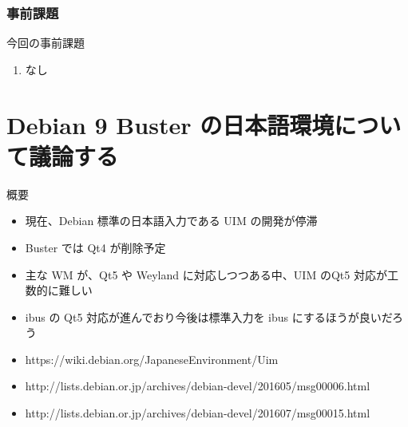 \documentclass[cjk,dvipdfmx,10pt,compress,%
hyperref={bookmarks=true,bookmarksnumbered=true,bookmarksopen=false,%
colorlinks=false,%
pdftitle={第 132 回 関西 Debian 勉強会},%
pdfauthor={かわだ},%
pdfsubject={資料},%
}]{beamer}
\begin{document}

\begin{frame}[fragile]
  \frametitle{事前課題}
  \begin{block}{今回の事前課題}
    \begin{enumerate}
    \item なし
    \end{enumerate}
  \end{block}
\end{frame}


\section{Debian 9 Buster の日本語環境について議論する}
\begin{frame}[fragile]
  \begin{block}{概要}
  \begin{itemize}
	\item 現在、Debian 標準の日本語入力である UIM の開発が停滞
	\item Buster では Qt4 が削除予定
	\item 主な WM が、Qt5 や Weyland に対応しつつある中、UIM のQt5 対応が工数的に難しい
	\item ibus の Qt5 対応が進んでおり今後は標準入力を ibus にするほうが良いだろう
  \end{itemize}

  \begin{itemize}
		\item https://wiki.debian.org/JapaneseEnvironment/Uim
		\item http://lists.debian.or.jp/archives/debian-devel/201605/msg00006.html
		\item http://lists.debian.or.jp/archives/debian-devel/201607/msg00015.html
  \end{itemize}
  \end{block}
\end{frame}
\end{document}
